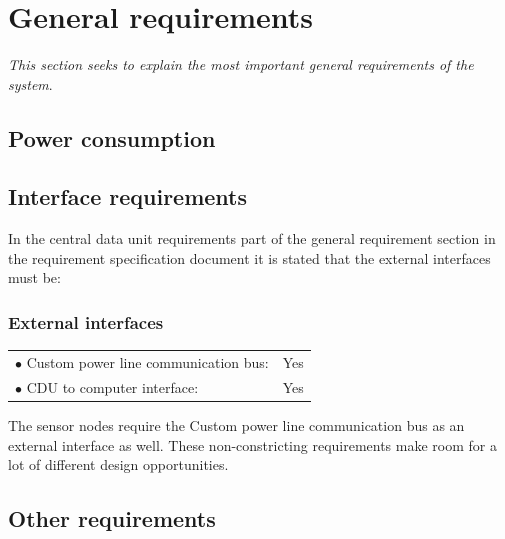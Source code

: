 \section{General requirements}
\textit{This section seeks to explain the most important general requirements of the system}.
\subsection{Power consumption}

\subsection{Interface requirements}
In the central data unit requirements part of the general requirement section in the requirement specification document it is stated that the external interfaces must be:
\subsubsection{External interfaces}
\begin{table}[H]
	\begin{tabular}{p{8cm} p{2cm}}
	$\bullet$ Custom power line communication bus: & Yes\\
	$\bullet$ CDU to computer interface: & Yes\\
	\end{tabular}
\end{table}
The sensor nodes require the Custom power line communication bus as an external interface as well. These non-constricting requirements make room for a lot of different design opportunities.

\subsection{Other requirements}
